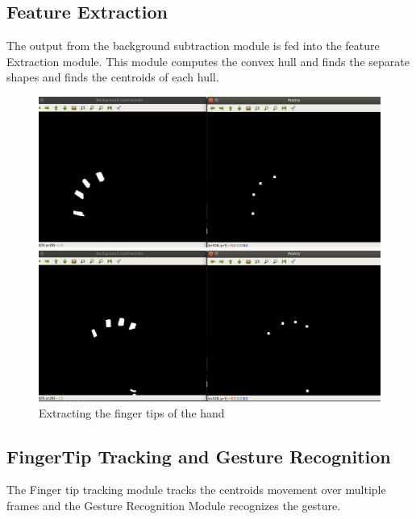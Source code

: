 \documentclass[11pt]{report}
\begin{document}
\subsection{Feature Extraction}

The output from the background subtraction module is fed into the feature Extraction
module. This module computes the convex hull and finds the separate shapes and finds the centroids of 
each hull.

\begin{figure}[h]
    \includegraphics[width=15cm]{featuretest.png}
    
    \includegraphics[width=15cm]{featuretest2.png}
    \caption{Extracting the finger tips of the hand}
\end{figure}

\subsection{FingerTip Tracking and Gesture Recognition}

The Finger tip tracking module tracks the centroids movement over multiple frames and the Gesture Recognition Module recognizes the gesture.
\end{document}
